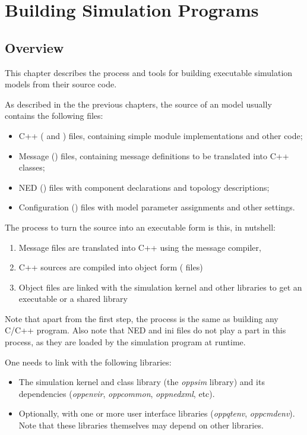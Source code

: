\chapter{Building Simulation Programs}
\label{cha:build-sim-progs}

\section{Overview}
\label{sec:build-sim-progs:overview}

This chapter describes the process and tools for building executable simulation
models from their source code.

As described in the the previous chapters, the source of an {\opp} model usually
contains the following files:

\begin{itemize}
  \item C++ ( and ) files, containing simple module
        implementations and other code;
  \item Message () files, containing message definitions to be
        translated into C++ classes;
  \item NED () files with component declarations and topology
        descriptions;
  \item Configuration () files with model parameter assignments and 
        other settings.
\end{itemize}

The process to turn the source into an executable form is this, in nutshell:

\begin{enumerate}
  \item Message files are translated into C++ using the message compiler,
  \item C++ sources are compiled into object form ( files)
  \item Object files are linked with the simulation kernel and other 
        libraries to get an executable or a shared library
\end{enumerate}

Note that apart from the first step, the process is the same as building any 
C/C++ program. Also note that NED and ini files do not play a part in this
process, as they are loaded by the simulation program at runtime.

One needs to link with the following libraries:

\begin{itemize}
  \item The simulation kernel and class library (the
        \textit{oppsim} library) and its dependencies (\textit{oppenvir},
        \textit{oppcommon}, \textit{oppnedxml}, etc).
  \item Optionally, with one or more user interface libraries
        (\textit{oppqtenv}, \textit{oppcmdenv}). Note that these libraries
        themselves may depend on other libraries.
\end{itemize}

